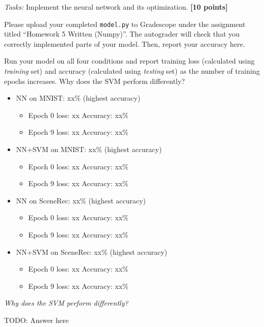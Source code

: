 \documentclass{csci1430}
\begin{document}
\pagebreak
\begin{orangebox}
\emph{Tasks:} Implement the neural network and its optimization. \textbf{[10 points]}

\vspace{1em}
Please upload your completed \texttt{model.py} to Gradescope under the assignment titled ``Homework 5 Written (Numpy)''. The autograder will check that you correctly implemented parts of your model. Then, report your accuracy here.
\end{orangebox}

\begin{orangebox}
Run your model on all four conditions and report training loss (calculated using \emph{training} set) and accuracy (calculated using \emph{testing} set) as the number of training epochs increases. Why does the SVM perform differently?
\end{orangebox}
\begin{answer}[height=30]
\begin{itemize}
\item NN on MNIST: xx\% (highest accuracy)
    \begin{itemize}
    \item Epoch 0 loss: xx     Accuracy: xx\%
    \item Epoch 9 loss: xx     Accuracy: xx\%
    \end{itemize}
\item NN+SVM on MNIST: xx\% (highest accuracy)
    \begin{itemize}
    \item Epoch 0 loss: xx     Accuracy: xx\%
    \item Epoch 9 loss: xx     Accuracy: xx\%
    \end{itemize}
\item NN on SceneRec: xx\% (highest accuracy)
    \begin{itemize}
    \item Epoch 0 loss: xx     Accuracy: xx\%
    \item Epoch 9 loss: xx     Accuracy: xx\%
    \end{itemize}
\item NN+SVM on SceneRec: xx\% (highest accuracy)
    \begin{itemize}
    \item Epoch 0 loss: xx     Accuracy: xx\%
    \item Epoch 9 loss: xx     Accuracy: xx\%
    \end{itemize}
\end{itemize}

\emph{Why does the SVM perform differently?}

TODO: Answer here
\end{answer}
\end{document}
